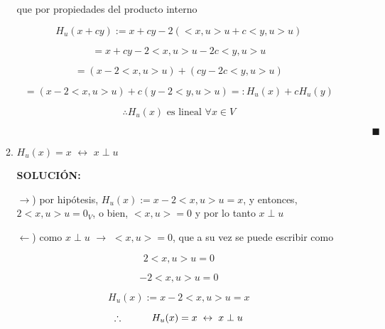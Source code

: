 \documentclass[12pt,a4paper]{article}
\begin{document}
\begin{enumerate}
\begin{enumerate}
        que por propiedades del producto interno
        
        \begin{equation*}
            H_u(x+cy):=x+cy-2(<x,u>u+c<y,u>u)
        \end{equation*}
        
        \begin{equation*}
            =x+cy-2<x,u>u-2c<y,u>u
        \end{equation*}
        
        \begin{equation*}
            =(x-2<x,u>u)+(cy-2c<y,u>u)
        \end{equation*}
        
        \begin{equation*}
            =(x-2<x,u>u)+c(y-2<y,u>u)=:H_u(x)+cH_u(y)
        \end{equation*}
        
        \begin{equation*}
            \therefore H_u(x)  \text{ es lineal } \forall x \in V 
        \end{equation*}
        
        $\hspace{15cm} \blacksquare$
        
        \item $H_u(x)=x$   $\leftrightarrow$   $x \perp u$
        
        \textbf{SOLUCIÓN:}
        
        $\rightarrow$) por hipótesis, $H_u(x):=x-2<x,u>u=x$, y entonces, $2<x,u>u=0_V$, o bien, $<x,u>=0$ y por lo tanto $x \perp u$
        
        $\leftarrow$) como $x \perp u$ $\rightarrow$ $<x,u>=0$, que a su vez se puede escribir como 
        
        \begin{equation*}
            2<x,u>u=0
        \end{equation*}
        
        \begin{equation*}
            -2<x,u>u=0
        \end{equation*}
        
        \begin{equation*}
            H_u(x):=x-2<x,u>u=x
        \end{equation*}
        
        \begin{equation*}
            \therefore \hspace{1cm} H_u(x)=x \hspace{0.1cm}   \leftrightarrow \hspace{0.1cm}   x \perp u
        \end{equation*}
        

\end{enumerate}
\end{enumerate}
\end{document}
